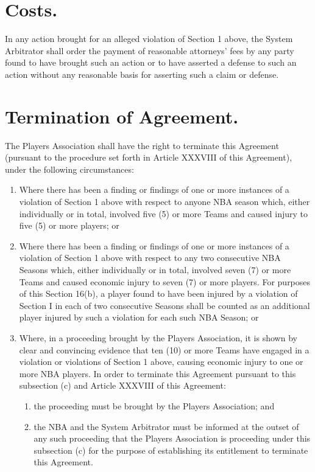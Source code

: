 \documentclass[
]{book}
\providecommand{\tightlist}{%
  \setlength{\itemsep}{0pt}\setlength{\parskip}{0pt}}
\begin{document}
\hypertarget{costs.}{%
\section{Costs.}\label{costs.}}

In any action brought for an alleged violation of Section 1 above, the System Arbitrator shall order the payment of reasonable attorneys' fees by any party found to have brought such an action or to have asserted a defense to such an action without any reasonable basis for asserting such a claim or defense.

\hypertarget{termination-of-agreement.}{%
\section{Termination of Agreement.}\label{termination-of-agreement.}}

The Players Association shall have the right to terminate this Agreement (pursuant to the procedure set forth in Article XXXVIII of this Agreement), under the following circumstances:

\begin{enumerate}
\def\labelenumi{(\alph{enumi})}
\tightlist
\item
  Where there has been a finding or findings of one or more instances of a violation of Section 1 above with respect to anyone NBA season which, either individually or in total, involved five (5) or more Teams and caused injury to five (5) or more players; or
\item
  Where there has been a finding or findings of one or more instances of a violation of Section 1 above with respect to any two consecutive NBA Seasons which, either individually or in total, involved seven (7) or more Teams and caused economic injury to seven (7) or more players. For purposes of this Section 16(b), a player found to have been injured by a violation of Section I in each of two consecutive Seasons shall be counted as an additional player injured by such a violation for each such NBA Season; or
\item
  Where, in a proceeding brought by the Players Association, it is shown by clear and convincing evidence that ten (10) or more Teams have engaged in a violation or violations of Section 1 above, causing economic injury to one or more NBA players. In order to terminate this Agreement pursuant to this subsection (c) and Article XXXVIII of this Agreement:

  \begin{enumerate}
  \def\labelenumii{(\roman{enumii})}
  \tightlist
  \item
    the proceeding must be brought by the Players Association; and
  \item
    the NBA and the System Arbitrator must be informed at the outset of any such proceeding that the Players Association is proceeding under this subsection (c) for the purpose of establishing its entitlement to terminate this Agreement.
  \end{enumerate}
\end{enumerate}
\end{document}
